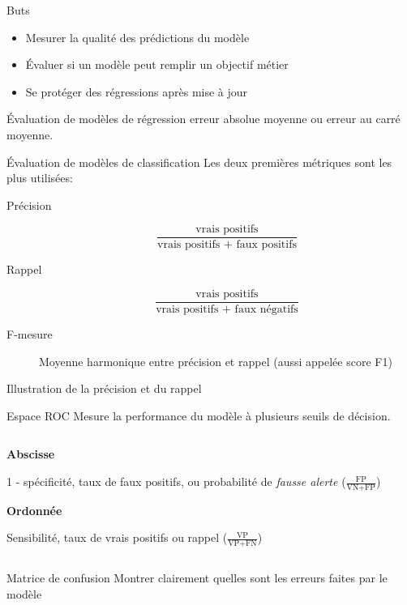 \begin{frame}{Buts}
  \begin{itemize}[<+->]
    \item Mesurer la qualité des prédictions du modèle
    \item Évaluer si un modèle peut remplir un objectif métier
    \item Se protéger des régressions après mise à jour
  \end{itemize}
\end{frame}

\begin{frame}{Évaluation de modèles de régression}
  erreur absolue moyenne ou erreur au carré moyenne.
\end{frame}

\begin{frame}{Évaluation de modèles de classification}
  Les deux premières métriques sont les plus utilisées:
  \begin{description}
  \item[Précision]
    \[
    \frac{\text{vrais positifs}}{\text{vrais positifs + faux positifs}}
    \]
  \item[Rappel]
    \[
    \frac{\text{vrais positifs}}{\text{vrais positifs + faux négatifs}}
  \]
  \item[F-mesure] Moyenne harmonique entre précision et rappel (aussi appelée score F1)
  \end{description}
\end{frame}

\begin{frame}{Illustration de la précision et du rappel}
\end{frame}

\begin{frame}{Espace ROC}
  Mesure la performance du modèle à plusieurs seuils de décision.
  \begin{columns}
    \begin{column}{.48\textwidth}
      \textbf{Abscisse}

      1 - spécificité, taux de faux positifs, ou probabilité de \emph{fausse alerte} ($\frac{\text{FP}}{\text{VN} + \text{FP}}$)
 
      \vspace{1cm}
      \textbf{Ordonnée}
  
      Sensibilité, taux de vrais positifs ou rappel ($\frac{\text{VP}}{\text{VP} + \text{FN}}$)
    \end{column}
    \begin{column}{.52\textwidth}
    \end{column}
  \end{columns}
\end{frame}

\begin{frame}{Matrice de confusion}
  Montrer clairement quelles sont les erreurs faites par le modèle
\end{frame}
